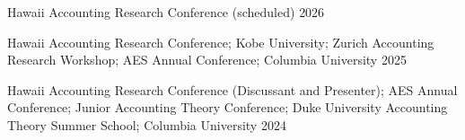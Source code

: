 

\begin{cventries}

\cventrylong
    {Hawaii Accounting Research Conference (scheduled)}  %
    {2026} %
    {}

\cventrylong
    {Hawaii Accounting Research Conference; Kobe University; Zurich Accounting Research Workshop; AES Annual Conference; Columbia University}  %
    {2025} %
    {}
	
\cventrylong
	{Hawaii Accounting Research Conference (Discussant and Presenter); AES Annual Conference; Junior Accounting Theory Conference; Duke University Accounting Theory Summer School; Columbia University}  %
    {2024} %
    {}
    
\end{cventries}
